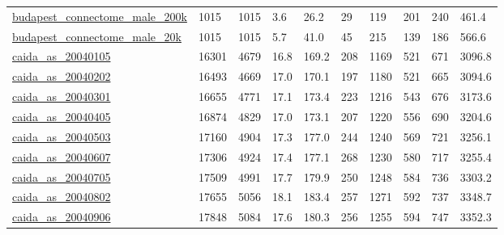\begin{longtable}{llllllllll}
 \href{http://pitgroup.org/connectome/}{budapest\_connectome\_male\_200k}                                                      & 1015       & 1015  & 3.6    & 26.2   & 29    & 119    & 201    & 240    & 461.4   \\
 \href{http://pitgroup.org/connectome/}{budapest\_connectome\_male\_20k}                                                       & 1015       & 1015  & 5.7    & 41.0   & 45    & 215    & 139    & 186    & 566.6   \\
 \href{http://snap.stanford.edu/data/as-caida.html}{caida\_as\_20040105}                                                      & 16301      & 4679  & 16.8   & 169.2  & 208   & 1169   & 521    & 671    & 3096.8  \\
 \href{http://snap.stanford.edu/data/as-caida.html}{caida\_as\_20040202}                                                      & 16493      & 4669  & 17.0   & 170.1  & 197   & 1180   & 521    & 665    & 3094.6  \\
 \href{http://snap.stanford.edu/data/as-caida.html}{caida\_as\_20040301}                                                      & 16655      & 4771  & 17.1   & 173.4  & 223   & 1216   & 543    & 676    & 3173.6  \\
 \href{http://snap.stanford.edu/data/as-caida.html}{caida\_as\_20040405}                                                      & 16874      & 4829  & 17.0   & 173.1  & 207   & 1220   & 556    & 690    & 3204.6  \\
 \href{http://snap.stanford.edu/data/as-caida.html}{caida\_as\_20040503}                                                      & 17160      & 4904  & 17.3   & 177.0  & 244   & 1240   & 569    & 721    & 3256.1  \\
 \href{http://snap.stanford.edu/data/as-caida.html}{caida\_as\_20040607}                                                      & 17306      & 4924  & 17.4   & 177.1  & 268   & 1230   & 580    & 717    & 3255.4  \\
 \href{http://snap.stanford.edu/data/as-caida.html}{caida\_as\_20040705}                                                      & 17509      & 4991  & 17.7   & 179.9  & 250   & 1248   & 584    & 736    & 3303.2  \\
 \href{http://snap.stanford.edu/data/as-caida.html}{caida\_as\_20040802}                                                      & 17655      & 5056  & 18.1   & 183.4  & 257   & 1271   & 592    & 737    & 3348.7  \\
 \href{http://snap.stanford.edu/data/as-caida.html}{caida\_as\_20040906}                                                      & 17848      & 5084  & 17.6   & 180.3  & 256   & 1255   & 594    & 747    & 3352.3  \\

\end{longtable}
